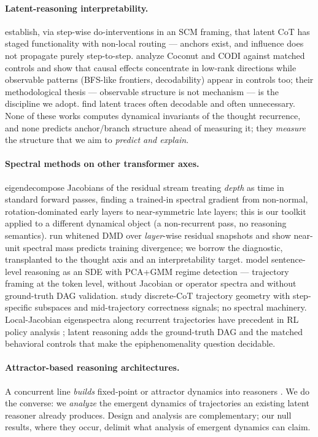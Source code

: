 \documentclass[11pt]{article}
\begin{document}
\paragraph{Latent-reasoning interpretability.} \citet{li2026dynamics} establish, via
step-wise do-interventions in an SCM framing, that latent CoT has staged functionality
with non-local routing --- anchors exist, and influence does not propagate purely
step-to-step. \citet{aswal2026observable} analyze Coconut and CODI against matched
controls and show that causal effects concentrate in low-rank directions while
observable patterns (BFS-like frontiers, decodability) appear in controls too; their
methodological thesis --- observable structure is not mechanism --- is the discipline we
adopt. \citet{dilgren2026easyinterp} find latent traces often decodable and often
unnecessary. None of these works computes dynamical invariants of the thought
recurrence, and none predicts anchor/branch structure ahead of measuring it; they
\emph{measure} the structure that we aim to \emph{predict and explain}.

\paragraph{Spectral methods on other transformer axes.} \citet{fernando2026dynamics}
eigendecompose Jacobians of the residual stream treating \emph{depth} as time in
standard forward passes, finding a trained-in spectral gradient from non-normal,
rotation-dominated early layers to near-symmetric late layers; this is our toolkit
applied to a different dynamical object (a non-recurrent pass, no reasoning semantics).
\citet{kim2026rksp} run whitened DMD over \emph{layer}-wise residual snapshots and show
near-unit spectral mass predicts training divergence; we borrow the diagnostic,
transplanted to the thought axis and an interpretability target.
\citet{carson2025statistical} model sentence-level reasoning as an SDE with PCA+GMM
regime detection --- trajectory framing at the token level, without Jacobian or operator
spectra and without ground-truth DAG validation. \citet{sun2026trajectories} study
discrete-CoT trajectory geometry with step-specific subspaces and mid-trajectory
correctness signals; no spectral machinery. Local-Jacobian eigenspectra along recurrent
trajectories have precedent in RL policy analysis \citep[e.g.][]{unravel2026}; latent
reasoning adds the ground-truth DAG and the matched behavioral controls that make the
epiphenomenality question decidable.

\paragraph{Attractor-based reasoning architectures.} A concurrent line \emph{builds}
fixed-point or attractor dynamics into reasoners
\citep{feinashley2026solveloop,huang2026equilibrium,movahedi2026fixedpoint,gu2026frontier}.
We do the converse: we \emph{analyze} the emergent dynamics of trajectories an existing
latent reasoner already produces. Design and analysis are complementary; our null
results, where they occur, delimit what analysis of emergent dynamics can claim.
\end{document}
